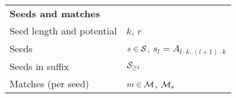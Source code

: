 \newcommand*{\tabindent}{\hspace{3mm}}
\begin{table}[h]
  \centering
  \begin{tabular}{ll}
	\hline
	\multicolumn{2}{l}{\textbf{Seeds and matches}} \\
	\tabindent Seed length and potential & $k$, $r$ \\
	\tabindent Seeds & $s\in \mathcal S$, $s_l = A_{l \cdot k..(l+1)\cdot k}$ \\
	\tabindent Seeds in suffix & $\mathcal S_{\geq i}$ \\
	\tabindent Matches (per seed)& $m \in \mathcal M$, $\mathcal M_s$\\

\end{tabular}
\end{table}
